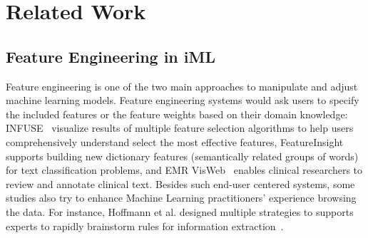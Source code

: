 \documentclass[chi_draft]{sigchi}
\begin{document}





\section{Related Work}
\label{sec:relatedWork}

\subsection{Feature Engineering in iML}
Feature engineering is one of the two main approaches to manipulate and adjust machine learning models.
Feature engineering systems would ask users to specify the included features or the feature weights based on their domain knowledge: INFUSE~\cite{krause2014infuse} visualize results of multiple feature selection algorithms to help users comprehensively understand select the most effective features, FeatureInsight~\cite{brooks2015featureinsight} supports building new dictionary features (semantically related groups of words) for text classification problems, and EMR VisWeb~\cite{trivedi2015interactive} enables clinical researchers to review and annotate clinical text.
Besides such end-user centered systems, some studies also try to enhance Machine Learning practitioners' experience browsing the data. For instance, Hoffmann et al. designed multiple strategies to supports experts to rapidly brainstorm rules for information extraction~\cite{hoffmann2015extreme}.
\end{document}
